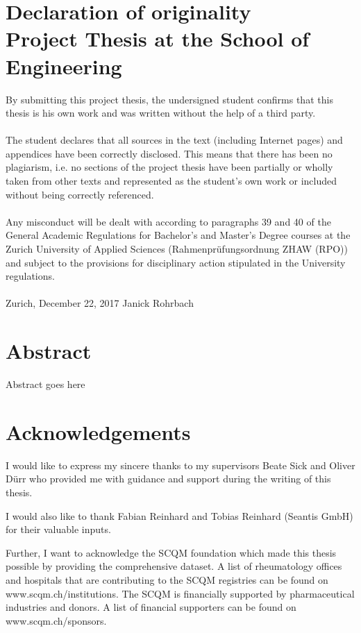 \documentclass[12pt]{article}
\begin{document}
\section*{Declaration of originality\\ \large{Project Thesis at the School of Engineering}}
By submitting this project thesis, the undersigned student confirms that this thesis is his own work and was written without the help of a third party. \\
\\
The student declares that all sources in the text (including Internet pages) and appendices have been correctly disclosed. This means that there has been no plagiarism, i.e. no sections of the project thesis have been partially or wholly taken from other texts and represented as the student’s own work or included without being correctly referenced. \\
\\
Any misconduct will be dealt with according to paragraphs 39 and 40 of the General Academic Regulations for Bachelor’s and Master’s Degree courses at the Zurich University of Applied Sciences (Rahmenprüfungsordnung ZHAW (RPO)) and subject to the provisions for disciplinary action stipulated in the University regulations.\\
\vspace{3cm} \\
Zurich, December 22, 2017 \hspace{5cm} Janick Rohrbach

\newpage

\section*{Abstract}
Abstract goes here

\newpage

\section*{Acknowledgements}
I would like to express my sincere thanks to my supervisors Beate Sick and Oliver Dürr who provided me with guidance and support during the writing of this thesis. 

I would also like to thank Fabian Reinhard and Tobias Reinhard (Seantis GmbH) for their valuable inputs. 

Further, I want to acknowledge the SCQM foundation which made this thesis possible by providing the comprehensive dataset. A list of rheumatology offices and hospitals that are contributing to the SCQM registries can be found on www.scqm.ch/institutions. The SCQM is financially supported by pharmaceutical industries and donors. A list of financial supporters can be found on www.scqm.ch/sponsors.
\end{document}
